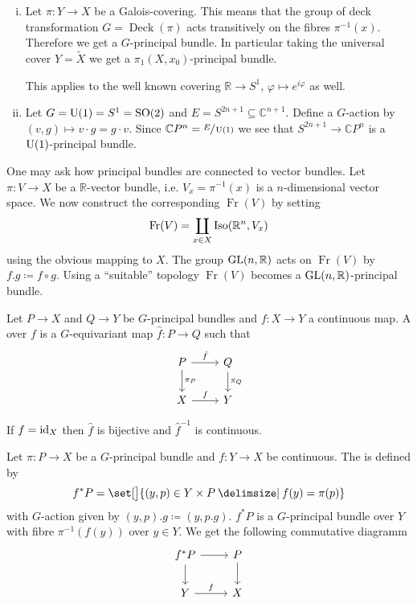 \begin{example}
	\begin{enumerate}[(i)]
		\item Let $\pi \colon Y \to X$ be a Galois-covering.
		This means that the group of deck transformation $G=\operatorname{Deck}(\pi)$ acts transitively on the fibres $\pi^{-1}(x)$.
		Therefore we get a $G$-principal bundle.
		In particular taking the universal cover $Y= \tilde{X}$ we get a $\pi_1(X,x_0)$-principal bundle.
		
		This applies to the well known covering $\mathbb{R} \to S^1$, $\varphi \mapsto e^{i \varphi}$ as well.
		\item Let $G= \operatorname{U}(1) =S^1 = \operatorname{SO}(2)$ and $E = S^{2n+1} \subseteq \mathbb{C}^{n+1}$.
		Define a $G$-action by $(v,g) \mapsto v \cdot g = g \cdot v$.
		Since $\mathbb{C}P^n = \sfrac{E}{\operatorname{U}(1)}$ we see that $S^{2n+1} \to \mathbb{C}P^n$ is a $\operatorname{U}(1)$-principal bundle.
	\end{enumerate}
\end{example}

One may ask how principal bundles are connected to vector bundles. 
Let $\pi \colon V \to X$ be a $\mathbb{R}$-vector bundle, i.e. $V_x = \pi^{-1}(x)$ is a  $n$-dimensional vector space.
We now construct the corresponding  $\operatorname{Fr}(V)$ by setting
\[
	\operatorname{Fr}(V) = \coprod_{x \in X} \operatorname{Iso}(\mathbb{R}^n, V_x)
\]
using the obvious mapping to $X$. 
The group $\operatorname{GL}(n,\mathbb{R})$ acts on $\operatorname{Fr}(V)$ by $f.g \coloneqq f \circ g$.
Using a \enquote{suitable} topology $\operatorname{Fr}(V)$ becomes a $\operatorname{GL}(n,\mathbb{R})$-principal bundle.

\begin{definition}[{name=[bundle map]}]
	Let $P \to X$ and $Q \to Y$ be $G$-principal bundles and $f \colon X \to Y$ a continuous map.
	A  over $f$ is a $G$-equivariant map $\hat{f} \colon P \to Q$ such that
	\[
		\begin{tikzcd}
			P \rar["\hat{f}"] \dar["\pi_P"] & Q \dar["\pi_Q"] \\
			X \rar["f"] & Y
		\end{tikzcd}
	\] 
\end{definition}

\begin{remark}[label=rmk:id_bundle]
	If $f = {\operatorname{id}_X}$ then $\hat{f}$ is bijective and $\hat{f}^{-1}$ is continuous.
\end{remark}

\begin{definition}[{name=[pullback bundle]}]
	Let $\pi \colon P \to X$ be a $G$-principal bundle and $f \colon Y \to X$ be continuous.
	The  is defined by
	\[
		f^*P = \set[\big]{(y,p) \in Y \times P \given f(y)= \pi(p)}
	\]
	with $G$-action given by $(y,p).g \coloneqq (y,p.g)$.
	$f^* P$ is a $G$-principal bundle over $Y$ with fibre $\pi^{-1}(f(y))$ over $y \in Y$.
	We get the following commutative diagramm
	\[
		\begin{tikzcd}
			f^* P \rar \dar & P \dar \\
			Y \rar["f"] & X
		\end{tikzcd}
	\]
\end{definition}

